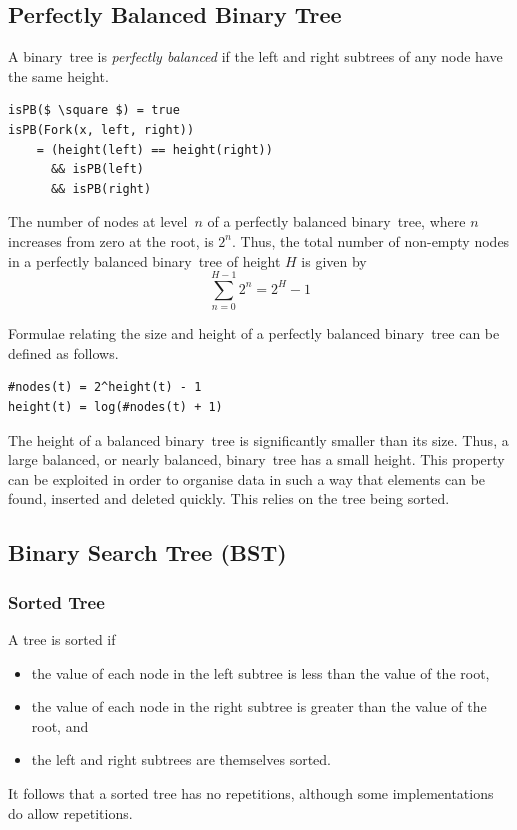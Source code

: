 \subsection{Perfectly Balanced Binary Tree}

A binary~tree is \emph{perfectly balanced} if the left and right subtrees of any node have the same height.
\begin{lstlisting}[mathescape=true]
isPB($ \square $) = true
isPB(Fork(x, left, right))
    = (height(left) == height(right))
      && isPB(left)
      && isPB(right)
\end{lstlisting}

The number of nodes at level~\( n \) of a perfectly balanced binary~tree, where \( n \) increases from zero at the root, is \( 2^{n} \).
Thus, the total number of non-empty nodes in a perfectly balanced binary~tree of height \( H \) is given by
\begin{equation*}
  \sum_{n=0}^{H-1} 2^{n} = 2^{H} - 1
\end{equation*}

Formulae relating the size and height of a perfectly balanced binary~tree can be defined as follows.
\begin{lstlisting}[mathescape=true]
#nodes(t) = 2^height(t) - 1
height(t) = log(#nodes(t) + 1)
\end{lstlisting}

The height of a balanced binary~tree is significantly smaller than its size.
Thus, a large balanced, or nearly balanced, binary~tree has a small height.
This property can be exploited in order to organise data in such a way that elements can be found, inserted and deleted quickly.
This relies on the tree being sorted.

\subsection{Binary Search Tree (BST)}

\subsubsection{Sorted Tree}

A tree is sorted if
\begin{itemize}
  \item the value of each node in the left subtree is less than the value of the root,
  \item the value of each node in the right subtree is greater than the value of the root, and
  \item the left and right subtrees are themselves sorted.
\end{itemize}
It follows that a sorted tree has no repetitions, although some implementations do allow repetitions.

